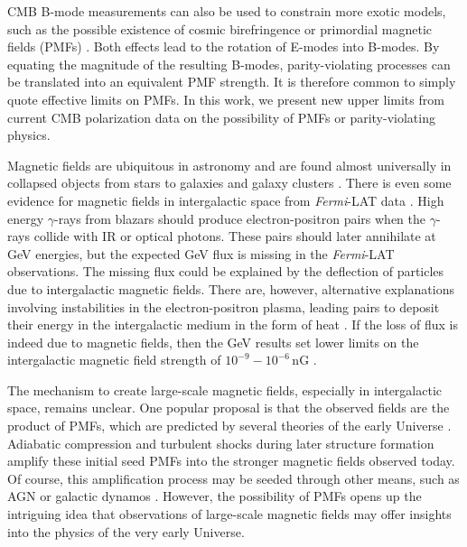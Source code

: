 \documentclass[apj]{emulateapj}
\newcommand{\fermilat}{\textit{Fermi}-LAT}
\begin{document}
CMB B-mode measurements can also be used to constrain more exotic models, such as the possible existence of cosmic birefringence \citep{carroll98,lue99} or primordial magnetic fields (PMFs) \citep{kosowsky96, seshadri01}.  
Both effects lead to the rotation of E-modes into B-modes. 
By equating the magnitude of the resulting B-modes, parity-violating processes can be translated into an equivalent PMF strength. 
It is therefore common to simply quote effective limits on PMFs. 
In this work, we present new upper limits from current CMB polarization data on the possibility of PMFs or parity-violating physics. 

Magnetic fields are ubiquitous in astronomy and are found almost universally in collapsed objects from stars to galaxies and galaxy clusters \citep[for a review, see][]{ryu12, widrow12}. 
There is even some evidence for magnetic fields in intergalactic space from \fermilat{} data \citep{neronov10}.
High energy $\gamma$-rays from blazars should  produce electron-positron pairs when the $\gamma$-rays collide with IR or optical photons. 
These pairs should later annihilate at GeV energies, but the expected GeV flux is missing in the \fermilat{} observations. 
The missing flux could be explained by the deflection of particles due to intergalactic magnetic fields. 
There are, however, alternative explanations involving instabilities in the electron-positron plasma, leading pairs to deposit their energy in the intergalactic medium in the form of heat \citep{broderick12}.
If the loss of flux is indeed due to magnetic fields, then the GeV results set lower limits on the intergalactic magnetic field strength of $10^{-9} - 10^{-6}$\,nG \citep{tavecchio10,taylor11,dermer11,vovk12}.



The mechanism to create large-scale magnetic fields, especially in intergalactic space, remains unclear. 
One popular proposal is that the observed fields are the product of PMFs, which are predicted by several theories of the early Universe \citep[e.g.,][]{turner88, grasso98,ichiki06}. 
Adiabatic compression and turbulent shocks during later structure formation amplify these initial seed PMFs into the stronger magnetic fields observed today. 
Of course, this amplification process may be seeded through other means, such as AGN or galactic dynamos \citep[for a review, see][]{giovannini04}. 
However, the possibility of PMFs opens up the intriguing idea that observations of large-scale magnetic fields may offer insights into the physics of the very early Universe. 
\end{document}
